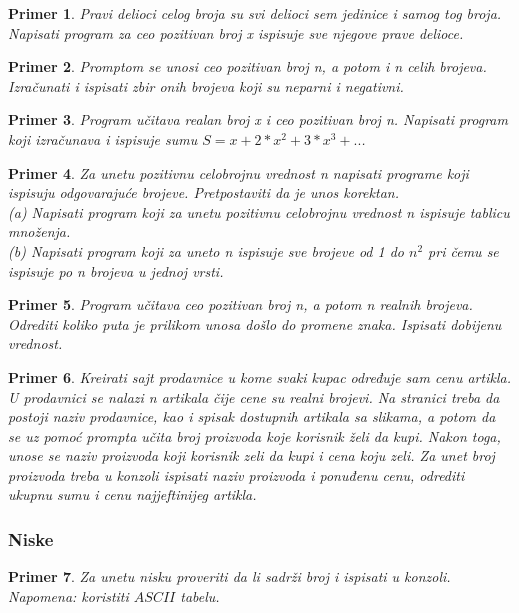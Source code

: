 \documentclass[a4paper]{article}
\newtheorem{primer}{Primer}[section]
\begin{document}
\begin{primer}
Pravi delioci celog broja su svi delioci sem jedinice i samog
tog broja. Napisati program za ceo pozitivan broj x ispisuje sve njegove
prave delioce.
\end{primer}

\begin{primer}
Promptom se unosi ceo pozitivan broj n, a potom i n celih
brojeva. Izračunati i ispisati zbir onih brojeva koji su neparni i negativni.
\end{primer}

\begin{primer}
Program učitava realan broj x i ceo pozitivan broj n.
Napisati program koji izračunava i ispisuje sumu $S=x + 2*x^2 + 3*x^3 + ..$.
\end{primer}

\begin{primer}
Za unetu pozitivnu celobrojnu vrednost n napisati programe
koji ispisuju odgovarajuće brojeve. Pretpostaviti da je unos korektan.\\
(a) Napisati program koji za unetu pozitivnu celobrojnu vrednost n ispisuje
tablicu množenja.\\
(b) Napisati program koji za uneto n ispisuje sve brojeve od 1 do $n^2$ pri čemu se ispisuje po n brojeva u jednoj vrsti.\\
\end{primer}

\begin{primer}
Program učitava ceo pozitivan broj n, a potom n realnih
brojeva. Odrediti koliko puta je prilikom unosa došlo do promene znaka. Ispisati
dobijenu vrednost.
\end{primer}

\begin{primer}
Kreirati sajt prodavnice u kome svaki kupac određuje sam cenu artikla. U prodavnici se nalazi n artikala čije cene su realni brojevi. Na stranici treba da postoji naziv prodavnice, kao i spisak dostupnih artikala sa slikama, a potom da se uz pomoć prompta učita broj proizvoda koje korisnik želi da kupi. Nakon toga, unose se naziv proizvoda koji korisnik zeli da kupi i cena koju zeli. Za unet broj proizvoda treba u konzoli ispisati naziv proizvoda i ponuđenu cenu, odrediti ukupnu sumu i cenu najjeftinijeg artikla.
\end{primer}

\subsubsection{Niske}
\begin{primer}
Za unetu nisku proveriti da li sadrži broj i ispisati u konzoli. Napomena: koristiti $ASCII$ tabelu.
\end{primer}
\end{document}

